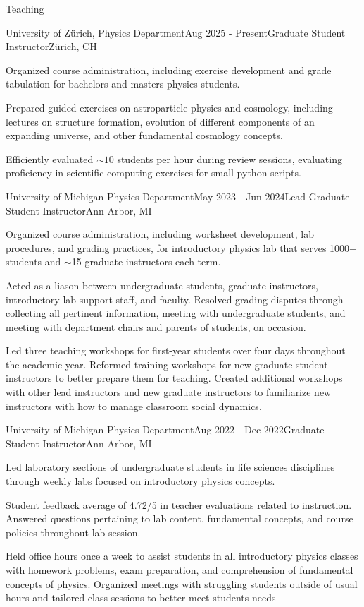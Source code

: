 \documentclass{resume} %
\begin{document}
\begin{rSection}{Teaching}
\begin{rSubsection}{University of Zürich, Physics Department}{Aug 2025 - Present}{Graduate Student Instructor}{Zürich, CH}
    \item Organized course administration, including exercise development and grade tabulation for bachelors and masters physics students.
    \item Prepared guided exercises on astroparticle physics and cosmology, including lectures on structure formation, evolution of different components of an expanding universe, and other fundamental cosmology concepts.
    \item Efficiently evaluated $\sim10$ students per hour during review sessions, evaluating proficiency in scientific computing exercises for small python scripts.
\end{rSubsection}

\begin{rSubsection}{University of Michigan Physics Department}{May 2023 - Jun 2024}{Lead Graduate Student Instructor}{Ann Arbor, MI}
    \item Organized course administration, including worksheet development, lab procedures, and grading practices, for introductory physics lab that serves 1000+ students and $\sim$15 graduate instructors each term.
    \item Acted as a liason between undergraduate students, graduate instructors, introductory lab support staff, and faculty. Resolved grading disputes through collecting all pertinent information, meeting with undergraduate students, and meeting with department chairs and parents of students, on occasion.
    \item Led three teaching workshops for first-year students over four days throughout the academic year. Reformed training workshops for new graduate student instructors to better prepare them for teaching. Created additional workshops with other lead instructors and new graduate instructors to familiarize new instructors with how to manage classroom social dynamics. 
\end{rSubsection}

\begin{rSubsection}{University of Michigan Physics Department}{Aug 2022 - Dec 2022}{Graduate Student Instructor}{Ann Arbor, MI}
    \item Led laboratory sections of undergraduate students in life sciences disciplines through weekly labs focused on introductory physics concepts. 
    \item Student feedback average of 4.72/5 in teacher evaluations related to instruction. Answered questions pertaining to lab content, fundamental concepts, and course policies throughout lab session.
    \item Held office hours once a week to assist students in all introductory physics classes with homework problems, exam preparation, and comprehension of fundamental concepts of physics. Organized meetings with struggling students outside of usual hours and tailored class sessions to better meet students needs


\end{rSubsection}
\end{rSection}
\end{document}
